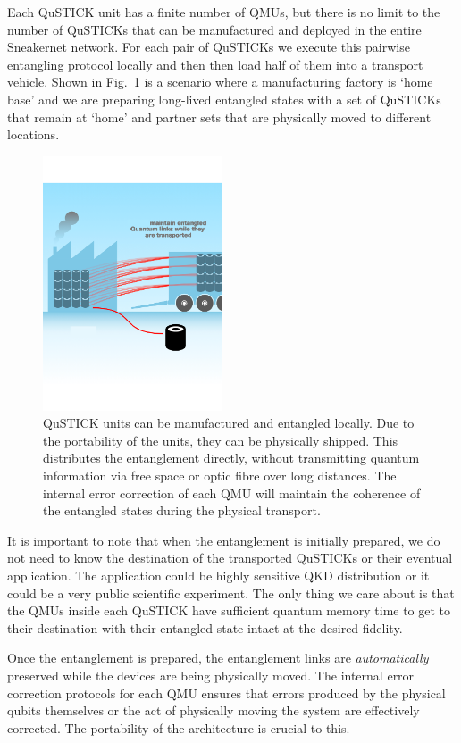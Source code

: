 \documentclass[twocolumn, aps, rmp, amsmath, amssymb, nofootinbib, superscriptaddress, longbibliography, floatfix, table-of-contents, eqsecnum]{revtex4-2}
\begin{document}
Each QuSTICK unit has a finite number of QMUs, but there is no limit to the number of QuSTICKs that can be manufactured and deployed in the entire Sneakernet network. For each pair of QuSTICKs we execute this pairwise entangling protocol locally and then then load half of them into a transport vehicle. Shown in Fig.~\ref{fig:loading} is a scenario where a manufacturing factory is `home base' and we are preparing long-lived entangled states with a set of QuSTICKs that remain at `home' and partner sets that are physically moved to different locations. 

\begin{figure}[htbp!]
	\includegraphics[clip=true, width=0.475\textwidth]{qustick2}
	\caption{QuSTICK units can be manufactured and entangled locally.  Due to the portability of the units, they can be physically shipped.  This distributes the entanglement directly, without transmitting quantum information via free space or optic fibre over long distances.  The internal error correction of each QMU will maintain the coherence of the entangled states during the physical transport.} \label{fig:loading}
\end{figure}

It is important to note that when the entanglement is initially prepared, we do not need to know the destination of the transported QuSTICKs or their eventual application. The application could be highly sensitive QKD distribution or it could be a very public scientific experiment. The only thing we care about is that the QMUs inside each QuSTICK have sufficient quantum memory time to get to their destination with their entangled state intact at the desired fidelity.

Once the entanglement is prepared, the entanglement links are \textit{automatically} preserved while the devices are being physically moved. The internal error correction protocols for each QMU ensures that errors produced by the physical qubits themselves or the act of physically moving the system are effectively corrected. The portability of the architecture is crucial to this. 
\end{document}
